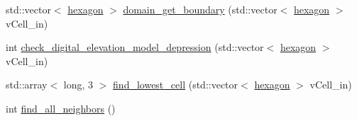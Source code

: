 \begin{DoxyCompactItemize}
std\-::vector$<$ \hyperlink{classhexwatershed_1_1hexagon}{hexagon} $>$ \hyperlink{classhexwatershed_1_1domain_a319189008e11abaad96a2a11010cff33}{domain\-\_\-get\-\_\-boundary} (std\-::vector$<$ \hyperlink{classhexwatershed_1_1hexagon}{hexagon} $>$ v\-Cell\-\_\-in)
\item 
int \hyperlink{classhexwatershed_1_1domain_a5ffef533f8ad17241ff427bc5aa87fdf}{check\-\_\-digital\-\_\-elevation\-\_\-model\-\_\-depression} (std\-::vector$<$ \hyperlink{classhexwatershed_1_1hexagon}{hexagon} $>$ v\-Cell\-\_\-in)
\item 
std\-::array$<$ long, 3 $>$ \hyperlink{classhexwatershed_1_1domain_ad2407e609e3ca92ae69de93b7c46f6e8}{find\-\_\-lowest\-\_\-cell} (std\-::vector$<$ \hyperlink{classhexwatershed_1_1hexagon}{hexagon} $>$ v\-Cell\-\_\-in)
\item 
int \hyperlink{classhexwatershed_1_1domain_a87908e456a8024f9f692ff581c59b4e2}{find\-\_\-all\-\_\-neighbors} ()
\end{DoxyCompactItemize}
